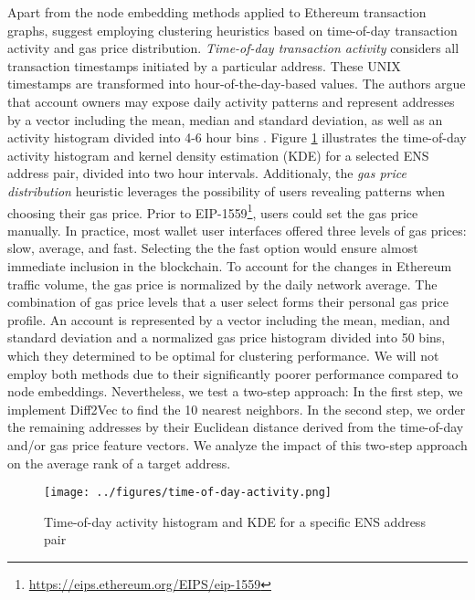 \documentclass[12pt,a4paper,titlepage,oneside,english]{article}
\begin{document}
Apart from the node embedding methods applied to Ethereum transaction graphs, \cite{Beres2020} suggest employing clustering heuristics based on time-of-day transaction activity and gas price distribution. \newline
\textit{Time-of-day transaction activity} considers all transaction timestamps initiated by a particular address. These UNIX timestamps are transformed into hour-of-the-day-based values. The authors argue that account owners may expose daily activity patterns and represent addresses by a vector including the mean, median and standard deviation, as well as an activity histogram divided into 4-6 hour bins \citep{Beres2020}.  Figure \ref{fig:ToD} illustrates the time-of-day activity histogram and kernel density estimation (KDE) for a selected ENS address pair, divided into two hour intervals.\newline
Additionaly, the \textit{gas price distribution} heuristic leverages the possibility of users revealing patterns when choosing their gas price. Prior to EIP-1559\footnote{\url{https://eips.ethereum.org/EIPS/eip-1559}}, users could set the gas price manually. In practice, most wallet user interfaces offered three levels of gas prices: slow, average, and fast. Selecting the the fast option would ensure almost immediate inclusion in the blockchain. To account for the changes in Ethereum traffic volume, the gas price is normalized by the daily network average. The combination of gas price levels that a user select forms their personal gas price profile. An account is represented by a vector including the mean, median, and standard deviation and a normalized gas price histogram divided into 50 bins, which they determined to be optimal for clustering performance. \citep{Beres2020} \newline
We will not employ both methods due to their significantly poorer performance compared to node embeddings. Nevertheless, we test a two-step approach: In the first step, we implement Diff2Vec to find the 10 nearest neighbors. In the second step, we order the remaining addresses by their Euclidean distance derived from the time-of-day and/or gas price feature vectors. We analyze the impact of this two-step approach on the average rank of a target address.

\begin{figure}[h!]
	\centering
	\texttt{[image: ../figures/time-of-day-activity.png]}
	\caption{Time-of-day activity histogram and KDE for a specific ENS address pair}
	\label{fig:ToD}
\end{figure} 
\end{document}
